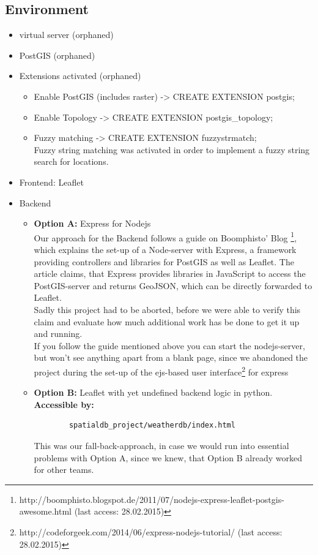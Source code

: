 \documentclass[paper=a4, fontsize=11pt]{article} %
\numberwithin{equation}{section} %
\numberwithin{figure}{section} %
\numberwithin{table}{section} %
\begin{document}
\subsection{Environment}
\begin{itemize}
	\item virtual server (orphaned)
    \item PostGIS (orphaned)
    \item Extensions activated (orphaned)
    \begin{itemize}
    	\item Enable PostGIS (includes raster) -> CREATE EXTENSION postgis;
   		\item Enable Topology -> CREATE EXTENSION postgis\_topology;
    	\item Fuzzy matching -> CREATE EXTENSION fuzzystrmatch;\\
    	Fuzzy string matching was activated in order to implement a fuzzy string search for locations.
    \end{itemize}
    \item Frontend: Leaflet
    \item Backend
     \begin{itemize}
    	\item \textbf{Option A:} Express for Nodejs\\ [0.1cm]
    	Our approach for the Backend follows a guide on Boomphisto' Blog
    	\footnote{http://boomphisto.blogspot.de/2011/07/nodejs-express-leaflet-postgis-awesome.html (last access: 28.02.2015)}, which explains the set-up of a Node-server with Express, a framework providing controllers and libraries for PostGIS as well as Leaflet.
    	The article claims, that Express provides libraries in JavaScript to access the PostGIS-server and returns GeoJSON, which can be directly forwarded to Leaflet.\\ Sadly this project had to be aborted, before we were able to verify this claim and evaluate how much additional work has be done to get it up and running.\\
    	If you follow the guide mentioned above you can start the nodejs-server, but won't see anything apart from a blank page, since we abandoned the project during the set-up of the ejs-based user interface\footnote{http://codeforgeek.com/2014/06/express-nodejs-tutorial/ (last access: 28.02.2015)} for express 
   		\item \textbf{Option B:} Leaflet with yet undefined backend logic in python.\\ [0.1cm]
   		\textbf {Accessible by:}
   		\begin{lstlisting}
   		spatialdb_project/weatherdb/index.html
   		\end{lstlisting}
   		This was our fall-back-approach, in case we would run into essential problems with Option A, since we knew, that Option B already worked for other teams.
    \end{itemize}
\end{itemize}
\end{document}
